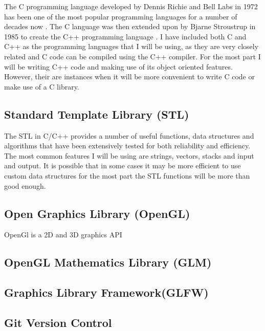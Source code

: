 The C programming language developed by Dennis Richie and Bell Labs in 1972 has been one of the most popular programming languages for a number of decades now \cite{ritchie1975c}. The C language was then extended upon by Bjarne Stroustrup in 1985 to create the C++ programming language \cite{stroustrup2000c++}. I have included both C and C++ as the programming languages that I will be using, as they are very closely related and C code can be compiled using the C++ compiler. For the most part I will be writing C++ code and making use of its object oriented features. However, their are instances when it will be more convenient to write C code or make use of a C library. 

\subsection{Standard Template Library (STL)}

The STL in C/C++ provides a number of useful functions, data structures and algorithms that have been extensively tested for both reliability and efficiency. The most common features I will be using are strings, vectors, stacks and input and output. It is possible that in some cases it may be more efficient to use custom data structures for the most part the STL functions will be more than good enough. \cite{horton2015stl} 

\subsection{Open Graphics Library (OpenGL)}

OpenGl is a 2D and 3D graphics API
\cite{movania2017opengl}

\subsection{OpenGL Mathematics Library (GLM)}

\subsection{Graphics Library Framework(GLFW)}

\subsection{Git Version Control}